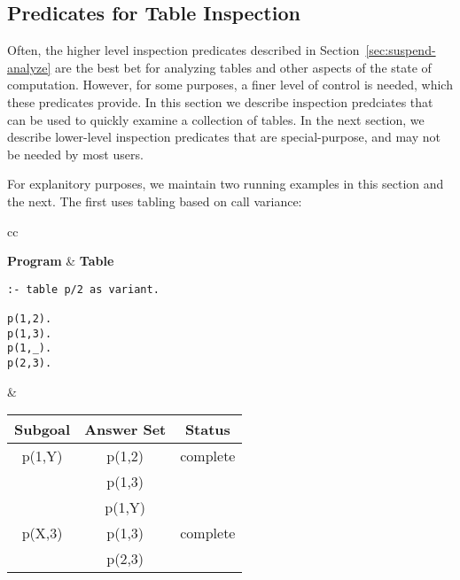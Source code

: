
\subsection{Predicates for Table Inspection} \label{sec:table-inspection}
\label{sec:TablePred:Inspection}

Often, the higher level inspection predicates described in
Section~\ref{sec:suspend-analyze} are the best bet for analyzing
tables and other aspects of the state of computation.  However, for
some purposes, a finer level of control is needed, which these
predicates provide.  In this section we describe inspection predciates
that can be used to quickly examine a collection of tables.  In the
next section, we describe lower-level inspection predicates that are
special-purpose, and may not be needed by most users.

For explanitory purposes, we maintain two running examples in this
section and the next.  The first uses tabling based on call variance:
%
\begin{center}
\begin{tabular}{cc}\hline \hline
{} \\ \hline \hline
\rule[-2ex]{0ex}{5ex} \textbf{Program} & \textbf{Table} \\
\begin{minipage}{14.5em}
\begin{verbatim}
:- table p/2 as variant.

p(1,2).
p(1,3).
p(1,_).
p(2,3).
\end{verbatim}
\end{minipage}
&
\begin{tabular}{|c|c|c|} \hline
  Subgoal & Answer Set & Status\\ \hline \hline
  p(1,Y) & p(1,2) & complete \\ 
         & p(1,3) & \\
         & p(1,Y) & \\ \hline
  p(X,3) & p(1,3) & complete \\ 
         & p(2,3) & \\ \hline
\end{tabular} \\
\vspace*{-2ex} \\ \hline \hline
\end{tabular}
\end{center}

